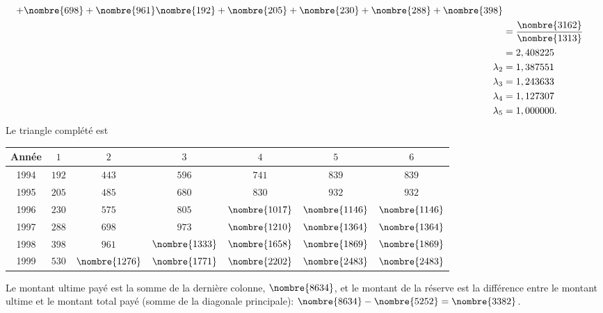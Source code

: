 \begin{exercice}
\begin{sol}
\begin{align*}
{                  +\nombre{698} + \nombre{961}}{\nombre{192} +
                  \nombre{205} + \nombre{230} + \nombre{288} + \nombre{398}}\\
                &=  \frac{\nombre{3162}}{\nombre{1313}}\\
                &= 2,408225\\
      \lambda_2 &=  1,387551\\
      \lambda_3 &= 1,243633\\
      \lambda_4 &=  1,127307\\
      \lambda_5 &= 1,000000.
    \end{align*}
    Le triangle complété est
    \begin{center}
      \begin{tabular}{|c|c c c c c c|}\hline
        Année & $1$ & $2$ & $3$ & $4$ & $5$ & $6$ \\ \hline
        1994 & $192$ & $443$ & $596$ & $741$ & $839$  & $839$ \\
        1995 & $205$ & $485$ & $680$ & $830$ & $932$ & $932$  \\
        1996 & $230$ & $575$ & $805$ & $\nombre{1017}$ & $\nombre{1146}$    & $\nombre{1146}$  \\
        1997 & $288$ & $698$ & $973$ &  $\nombre{1210}$   &   $\nombre{1364}$  & $\nombre{1364}$  \\
        1998 & $398$ & $961$ &  $\nombre{1333}$   &  $\nombre{1658}$   & $\nombre{1869}$    & $\nombre{1869}$  \\
        1999 & $530$ &  $\nombre{1276}$   &  $\nombre{1771}$   &   $\nombre{2202}$  &  $\nombre{2483}$   &  $\nombre{2483}$ \\ \hline
      \end{tabular}
    \end{center}
    Le montant ultime payé est la somme de la dernière colonne,
    $\nombre{8634}$, et le montant de la réserve est la différence
    entre le montant ultime et le montant total payé (somme de la
    diagonale principale):
    $\nombre{8634} - \nombre{5252} = \nombre{3382}$.
  \end{sol}
\end{exercice}

